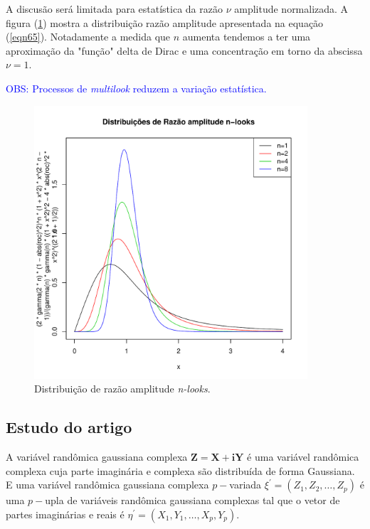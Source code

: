\documentclass[12pt,a4paper]{article}
\begin{document}
A discusão será limitada para estatística da razão $\nu$ amplitude normalizada. A figura (\ref{fig2}) mostra a distribuição razão amplitude apresentada na equação  (\ref{eqn65}). Notadamente a medida que $n$ aumenta tendemos a ter uma aproximação da "função" delta de Dirac e uma concentração em torno da abscissa $\nu=1$.

\textcolor{blue}{OBS: Processos de {\it multilook} reduzem a variação estatística.}

\begin{figure}[!h]
\centering
\includegraphics[width=4.0in]{fig4_eq_33_lee_1994.pdf}
	\caption{Distribuição de razão amplitude {\it n-looks}.}
\label{fig2}
\end{figure}


\subsection{Estudo do artigo  \cite{goodman1963}}


A variável randômica gaussiana complexa $\mathbf{Z=X+iY}$ é uma variável randômica complexa cuja parte imaginária e complexa são distribuída de forma Gaussiana.  E uma variável randômica gaussiana complexa $p-$variada $\xi^{'}=(Z_1,Z_2,\dots,Z_p)$ é uma $p-$upla  de variáveis randômica gaussiana complexas tal que o vetor de partes imaginárias e reais é $\eta^{'}=(X_1,Y_1,\dots,X_p,Y_p)$.
\end{document}
